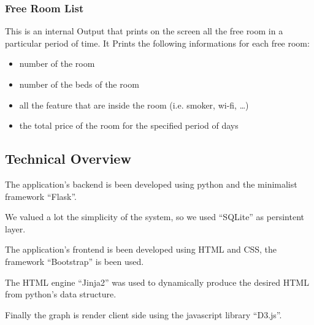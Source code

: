 \subsubsection{Free Room List}
This is an internal Output that prints on the screen all the free room in a particular period of time. It Prints the following informations for each free room:

\begin{itemize}
  \item number of the room
  \item number of the beds of the room
  \item all the feature that are inside the room (i.e. smoker, wi-fi, …)
  \item the total price of the room for the specified period of days
\end{itemize}

\subsection{Technical Overview}

The application's backend is been developed using python and the minimalist framework ``Flask''.

We valued a lot the simplicity of the system, so we used ``SQLite'' as persintent layer.

The application's frontend is been developed using HTML and CSS, the framework ``Bootstrap'' is been used.

The HTML engine ``Jinja2'' was used to dynamically produce the desired HTML from python's data structure.

Finally the graph is render client side using the javascript library ``D3.js''.
